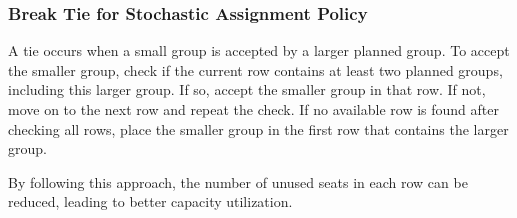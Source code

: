 \subsubsection{Break Tie for Stochastic Assignment Policy}
A tie occurs when a small group is accepted by a larger planned group. To accept the smaller group, check if the current row contains at least two planned groups, including this larger group. If so, accept the smaller group in that row. If not, move on to the next row and repeat the check. If no available row is found after checking all rows, place the smaller group in the first row that contains the larger group.

By following this approach, the number of unused seats in each row can be reduced, leading to better capacity utilization.











